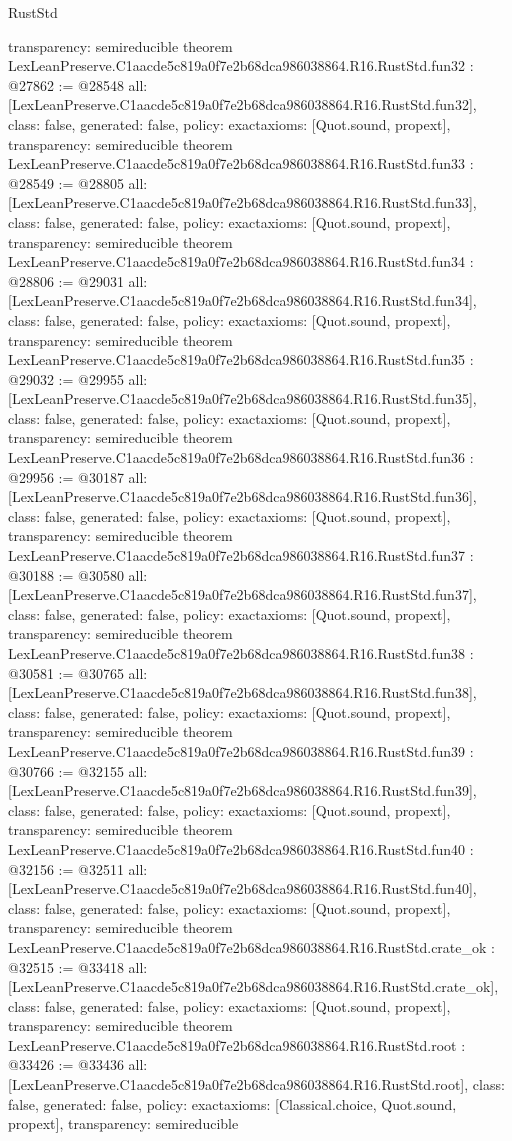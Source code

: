 \begin{lexlean}{RustStd}
\begin{coremodule}
{  transparency: semireducible
}
theorem LexLeanPreserve.C1aacde5c819a0f7e2b68dca986038864.R16.RustStd.fun32 : @27862 := @28548 {
  all: [LexLeanPreserve.C1aacde5c819a0f7e2b68dca986038864.R16.RustStd.fun32],
  class: false,
  generated: false,
  policy: exact{axioms: [Quot.sound, propext]},
  transparency: semireducible
}
theorem LexLeanPreserve.C1aacde5c819a0f7e2b68dca986038864.R16.RustStd.fun33 : @28549 := @28805 {
  all: [LexLeanPreserve.C1aacde5c819a0f7e2b68dca986038864.R16.RustStd.fun33],
  class: false,
  generated: false,
  policy: exact{axioms: [Quot.sound, propext]},
  transparency: semireducible
}
theorem LexLeanPreserve.C1aacde5c819a0f7e2b68dca986038864.R16.RustStd.fun34 : @28806 := @29031 {
  all: [LexLeanPreserve.C1aacde5c819a0f7e2b68dca986038864.R16.RustStd.fun34],
  class: false,
  generated: false,
  policy: exact{axioms: [Quot.sound, propext]},
  transparency: semireducible
}
theorem LexLeanPreserve.C1aacde5c819a0f7e2b68dca986038864.R16.RustStd.fun35 : @29032 := @29955 {
  all: [LexLeanPreserve.C1aacde5c819a0f7e2b68dca986038864.R16.RustStd.fun35],
  class: false,
  generated: false,
  policy: exact{axioms: [Quot.sound, propext]},
  transparency: semireducible
}
theorem LexLeanPreserve.C1aacde5c819a0f7e2b68dca986038864.R16.RustStd.fun36 : @29956 := @30187 {
  all: [LexLeanPreserve.C1aacde5c819a0f7e2b68dca986038864.R16.RustStd.fun36],
  class: false,
  generated: false,
  policy: exact{axioms: [Quot.sound, propext]},
  transparency: semireducible
}
theorem LexLeanPreserve.C1aacde5c819a0f7e2b68dca986038864.R16.RustStd.fun37 : @30188 := @30580 {
  all: [LexLeanPreserve.C1aacde5c819a0f7e2b68dca986038864.R16.RustStd.fun37],
  class: false,
  generated: false,
  policy: exact{axioms: [Quot.sound, propext]},
  transparency: semireducible
}
theorem LexLeanPreserve.C1aacde5c819a0f7e2b68dca986038864.R16.RustStd.fun38 : @30581 := @30765 {
  all: [LexLeanPreserve.C1aacde5c819a0f7e2b68dca986038864.R16.RustStd.fun38],
  class: false,
  generated: false,
  policy: exact{axioms: [Quot.sound, propext]},
  transparency: semireducible
}
theorem LexLeanPreserve.C1aacde5c819a0f7e2b68dca986038864.R16.RustStd.fun39 : @30766 := @32155 {
  all: [LexLeanPreserve.C1aacde5c819a0f7e2b68dca986038864.R16.RustStd.fun39],
  class: false,
  generated: false,
  policy: exact{axioms: [Quot.sound, propext]},
  transparency: semireducible
}
theorem LexLeanPreserve.C1aacde5c819a0f7e2b68dca986038864.R16.RustStd.fun40 : @32156 := @32511 {
  all: [LexLeanPreserve.C1aacde5c819a0f7e2b68dca986038864.R16.RustStd.fun40],
  class: false,
  generated: false,
  policy: exact{axioms: [Quot.sound, propext]},
  transparency: semireducible
}
theorem LexLeanPreserve.C1aacde5c819a0f7e2b68dca986038864.R16.RustStd.crate_ok : @32515 := @33418 {
  all: [LexLeanPreserve.C1aacde5c819a0f7e2b68dca986038864.R16.RustStd.crate_ok],
  class: false,
  generated: false,
  policy: exact{axioms: [Quot.sound, propext]},
  transparency: semireducible
}
theorem LexLeanPreserve.C1aacde5c819a0f7e2b68dca986038864.R16.RustStd.root : @33426 := @33436 {
  all: [LexLeanPreserve.C1aacde5c819a0f7e2b68dca986038864.R16.RustStd.root],
  class: false,
  generated: false,
  policy: exact{axioms: [Classical.choice, Quot.sound, propext]},
  transparency: semireducible
}


\end{coremodule}
\end{lexlean}
